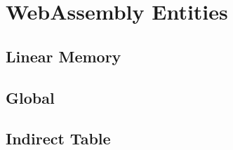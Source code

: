 \section{WebAssembly Entities}

\subsection{Linear Memory}

\subsection{Global}

\subsection{Indirect Table}